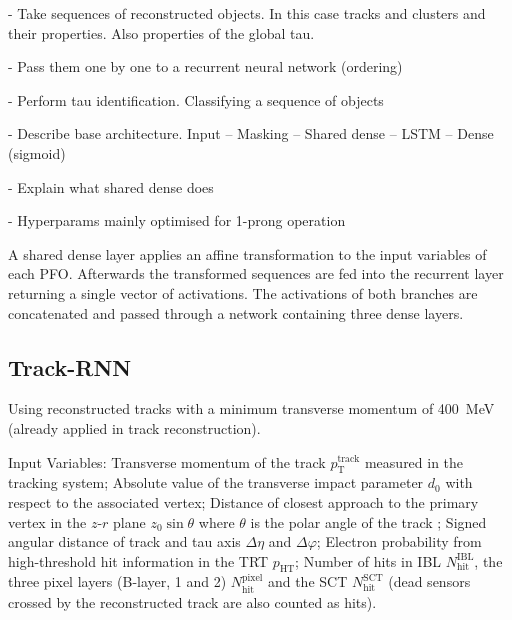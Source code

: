 - Take sequences of reconstructed objects. In this case tracks and clusters and
their properties. Also properties of the global tau.

- Pass them one by one to a recurrent neural network (ordering)

- Perform tau identification. Classifying a sequence of objects

- Describe base architecture. Input -- Masking -- Shared dense -- LSTM -- Dense (sigmoid)

- Explain what shared dense does

- Hyperparams mainly optimised for 1-prong operation




A shared
dense layer applies an affine transformation to the input variables of each PFO.
Afterwards the transformed sequences are fed into the recurrent layer returning
a single vector of activations.
The activations of both branches are
concatenated  and
passed through a network containing three dense layers.



\subsection{Track-RNN}
\label{sec:rnn_tracks}



Using reconstructed tracks with a minimum transverse momentum of
\SI{400}{\mega\electronvolt} (already applied in track reconstruction).

Input Variables: Transverse momentum of the track $p_\text{T}^\text{track}$
measured in the tracking system; Absolute value of the transverse impact
parameter $d_0$ with respect to the associated vertex; Distance of closest
approach to the primary vertex in the $z$-$r$ plane $z_0 \sin\theta$ where
$\theta$ is the polar angle of the track ; Signed angular distance of track and tau axis $\Delta \eta$ and
$\Delta \varphi$; Electron probability from high-threshold hit information in
the TRT $p_\text{HT}$; Number of hits in IBL $N_\text{hit}^\text{IBL}$, the
three pixel layers (B-layer, 1 and 2) $N_\text{hit}^\text{pixel}$ and the SCT
$N_\text{hit}^\text{SCT}$ (dead sensors crossed by the reconstructed track are
also counted as hits).

